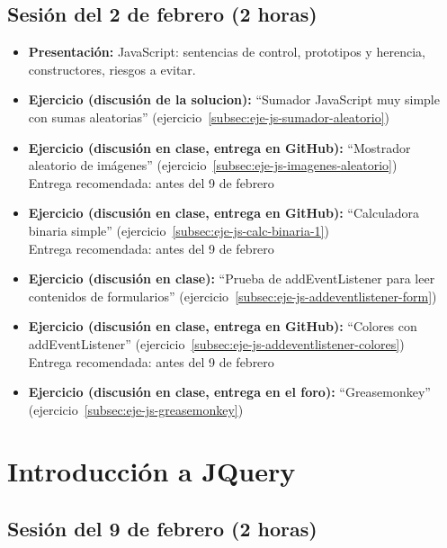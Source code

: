 \documentclass[a4paper,12pt]{report}
\begin{document}
\subsection{Sesión del 2 de febrero (2 horas)}

\begin{itemize}
\item \textbf{Presentación:} JavaScript: sentencias de control, prototipos y herencia, constructores, riesgos a evitar.
\item \textbf{Ejercicio (discusión de la solucion):} ``Sumador JavaScript muy simple con sumas aleatorias'' (ejercicio~\ref{subsec:eje-js-sumador-aleatorio})
\item \textbf{Ejercicio (discusión en clase, entrega en GitHub):} ``Mostrador aleatorio de imágenes'' (ejercicio~\ref{subsec:eje-js-imagenes-aleatorio}) \\
  Entrega recomendada: antes del 9 de febrero
\item \textbf{Ejercicio (discusión en clase, entrega en GitHub):} ``Calculadora binaria simple'' (ejercicio~\ref{subsec:eje-js-calc-binaria-1}) \\
  Entrega recomendada: antes del 9 de febrero
\item \textbf{Ejercicio (discusión en clase):} ``Prueba de addEventListener para leer contenidos de formularios'' (ejercicio~\ref{subsec:eje-js-addeventlistener-form})
\item \textbf{Ejercicio (discusión en clase, entrega en GitHub):} ``Colores con addEventListener'' (ejercicio~\ref{subsec:eje-js-addeventlistener-colores}) \\
  Entrega recomendada: antes del 9 de febrero
\item \textbf{Ejercicio (discusión en clase, entrega en el foro):} ``Greasemonkey'' (ejercicio~\ref{subsec:eje-js-greasemonkey})
\end{itemize}


\section{Introducción a JQuery}


\subsection{Sesión del 9 de febrero (2 horas)}
\end{document}
